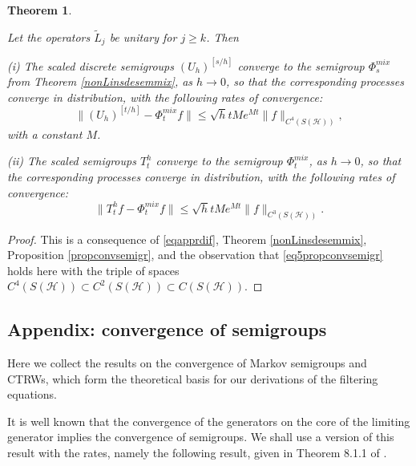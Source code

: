 \documentclass[12pt]{article}
\def\HC{\mathcal{H}}
\newtheorem{theorem}{Theorem}[section]
\begin{document}
\begin{theorem}
\label{thBeleqdif}

Let the operators $\tilde L_j$ be unitary for $j\ge k$. Then

(i) The scaled discrete semigroups $(U_h)^{[s/h]}$ converge to the semigroup $\Phi^{mix}_s$
from Theorem \ref{nonLinsdesemmix},
as $h\to 0$, so that the corresponding
processes converge in distribution,
 with the following rates of convergence:
\begin{equation}
\label{eq1thBeleqdif}
\|(U_h)^{[t/h]} -\Phi^{mix}_tf\| \le \sqrt h t M e^{Mt} \|f\|_{C^4(S(\HC))},
\end{equation}
with a constant $M$.

(ii) The scaled semigroups $T_t^h$ converge to the semigroup $\Phi^{mix}_t$,
as $h\to 0$, so that the corresponding
processes converge in distribution, with the following rates of convergence:
\begin{equation}
\label{eq2thBeleqdif}
\|T_t^hf -\Phi_t^{mix}f\| \le \sqrt h t M e^{Mt} \|f\|_{C^3(S(\HC))}.
\end{equation}
\end{theorem}

\begin{proof}
This is a consequence of \eqref{eqapprdif}, Theorem \ref{nonLinsdesemmix},
Proposition \ref{propconvsemigr}, and the observation that \eqref{eq5propconvsemigr}
holds here with  the triple of spaces $C^4(S(\HC))\subset C^2(S(\HC)) \subset C(S(\HC))$.
\end{proof}

\subsection{Appendix: convergence of semigroups}
\label{appsem}

Here we collect the results on the convergence of Markov semigroups and CTRWs, which form
the theoretical basis for our derivations of the filtering equations.

It is well known that the convergence of the generators on the core of the limiting generator
implies the convergence of semigroups. We shall use a version of this result with the rates,
namely the following result, given in Theorem 8.1.1 of \cite{Kolbook11}.
\end{document}
